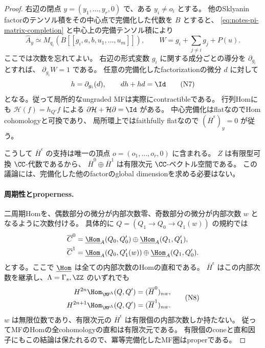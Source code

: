 \begin{proof}
右辺の閉点 \(y=(y_1,\ldots,y_r,0)\) で、ある \(y_i\ne o_i\) とする。
他のSklyanin factorのテンソル積をその中心点で完備化した代数を \(B\) とすると、
\eqref{eq:notes-pi-matrix-completion} と中心上の完備テンソル積により
\[
 \widehat A_y\simeq
 M_{q_i}\!\left(B[[g_i,a,b,u_1,\ldots,u_m]]\right),
 \qquad W=g_i+\sum_{j\ne i}g_j+P(u).
 \tag{N6}\label{eq:notes-pi-local-matrix}
\]
ここでは次数を忘れてよい。
右辺の形式変数 \(g_i\) に関する成分ごとの導分を \(\partial_{g_i}\) とすれば、
\(\partial_{g_i}W=1\) である。
任意の完備化したfactorizationの微分 \(d\) に対して
\[
 h=\partial_{g_i}(d),\qquad dh+hd=\Id
 \tag{N7}\label{eq:notes-pi-contraction}
\]
となる。従って局所的なungraded MFは実際にcontractibleである。
行列Homにも \(\mathcal H(f)=h_{Q'}f\) による
\(\partial\mathcal H+\mathcal H\partial=\Id\) がある。
中心完備化はflatなのでHom cohomologyと可換であり、
局所環上ではfaithfully flatなので
\((\overline H^\epsilon)_y=0\) が従う。

こうして \(\overline H^\epsilon\) の支持は唯一の頂点
\(o=(o_1,\ldots,o_r,0)\) に含まれる。
\(Z\) は有限型可換 \(\CC\)-代数であるから、
\(\overline H^0\oplus\overline H^1\) は有限次元 \(\CC\)-ベクトル空間である。
この議論には、完備化した他のfactorのglobal dimensionを求める必要はない。

\paragraph{周期性とproperness.}
二周期Homを、偶数部分の微分が内部次数零、奇数部分の微分が内部次数 \(w\)
となるように次数付ける。
具体的に \(Q=(Q_1\to Q_0\to Q_1(w))\) の規約では
\[
 \begin{aligned}
 \overline C^0&=\underline{\Hom}_A(Q_0,Q'_0)
       \oplus\underline{\Hom}_A(Q_1,Q'_1),\\
 \overline C^1&=\underline{\Hom}_A(Q_0,Q'_1(w))
       \oplus\underline{\Hom}_A(Q_1,Q'_0).
 \end{aligned}
\]
とする。ここで \(\underline{\Hom}\) は全ての内部次数のHomの直和である。
\(\overline H^\epsilon\) はこの内部次数を継承し、\(\Lambda=\Gamma_s,\ZZ\) のいずれでも
\[
 \begin{aligned}
 H^{2n}\Hom_{\MF^\Lambda}(Q,Q')
      &=(\overline H^0)_{nw},\\
 H^{2n+1}\Hom_{\MF^\Lambda}(Q,Q')
      &=(\overline H^1)_{nw}.
 \end{aligned}
 \tag{N8}\label{eq:notes-pi-hom-periodicity}
\]
\(w\) は無限位数であり、有限次元の \(\overline H^\epsilon\) は有限個の内部次数しか持たない。
従ってMFのHomの全cohomologyの直和は有限次元である。
有限個のconeと直和因子にもこの結論は保たれるので、冪等完備化したMF圏はproperである。


\end{proof}
